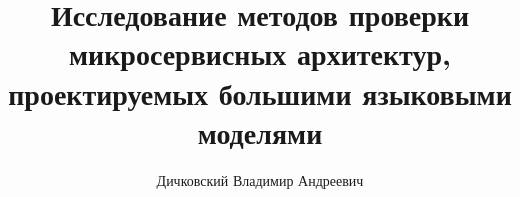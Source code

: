\documentclass[12pt, a4paper]{article}
\begin{document}
\title{Исследование методов проверки микросервисных архитектур, проектируемых большими языковыми моделями}
\author{Дичковский Владимир Андреевич}
\date{}
\maketitle





\end{document}
